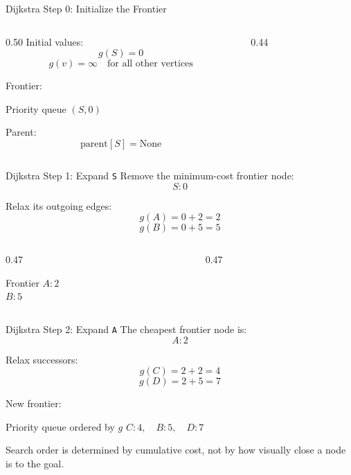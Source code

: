 \documentclass[aspectratio=169,10pt]{beamer}
\begin{document}
\begin{frame}[shrink=20]{Dijkstra Step 0: Initialize the Frontier}
  \begin{columns}[T,onlytextwidth]
    \begin{column}{0.50\textwidth}
      Initial values:
      \[
        g(S)=0
      \]
      \[
        g(v)=\infty \quad \text{for all other vertices}
      \]

      Frontier:
      \begin{block}{Priority queue}
        \centering
        $(S,0)$
      \end{block}

      Parent:
      \[
        \mathrm{parent}[S]=\mathrm{None}
      \]
    \end{column}

    \begin{column}{0.44\textwidth}
    \end{column}
  \end{columns}
\end{frame}

\begin{frame}[shrink=20]{Dijkstra Step 1: Expand \texttt{S}}
  Remove the minimum-cost frontier node:
  \[
    S:0
  \]

  Relax its outgoing edges:
  \[
    g(A)=0+2=2
  \]
  \[
    g(B)=0+5=5
  \]

  \begin{columns}[T,onlytextwidth]
    \begin{column}{0.47\textwidth}
      \begin{block}{Frontier}
        \centering
        $A:2$\\
        $B:5$
      \end{block}
    \end{column}

    \begin{column}{0.47\textwidth}
    \end{column}
  \end{columns}
\end{frame}

\begin{frame}[shrink=20]{Dijkstra Step 2: Expand \texttt{A}}
  The cheapest frontier node is:
  \[
    A:2
  \]

  Relax successors:
  \[
    g(C)=2+2=4
  \]
  \[
    g(D)=2+5=7
  \]

  New frontier:
  \begin{block}{Priority queue ordered by $g$}
    \centering
    $C:4,\quad B:5,\quad D:7$
  \end{block}

  \begin{keyidea}
    Search order is determined by cumulative cost, not by how visually close a node is to the goal.
  \end{keyidea}
\end{frame}
\end{document}
